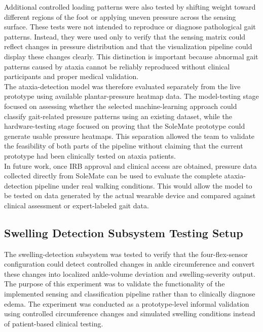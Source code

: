 \noindent Additional controlled loading patterns were also tested by shifting weight toward different regions of the foot or applying uneven pressure across the sensing surface. These tests were not intended to reproduce or diagnose pathological gait patterns. Instead, they were used only to verify that the sensing matrix could reflect changes in pressure distribution and that the visualization pipeline could display these changes clearly. This distinction is important because abnormal gait patterns caused by ataxia cannot be reliably reproduced without clinical participants and proper medical validation. \\

\noindent The ataxia-detection model was therefore evaluated separately from the live prototype using available plantar-pressure heatmap data. The model-testing stage focused on assessing whether the selected machine-learning approach could classify gait-related pressure patterns using an existing dataset, while the hardware-testing stage focused on proving that the SoleMate prototype could generate usable pressure heatmaps. This separation allowed the team to validate the feasibility of both parts of the pipeline without claiming that the current prototype had been clinically tested on ataxia patients. \\

\noindent In future work, once IRB approval and clinical access are obtained, pressure data collected directly from SoleMate can be used to evaluate the complete ataxia-detection pipeline under real walking conditions. This would allow the model to be tested on data generated by the actual wearable device and compared against clinical assessment or expert-labeled gait data.







\subsection{Swelling Detection Subsystem Testing Setup}
\label{subsec:swelling_detection_testing_setup}


\noindent The swelling-detection subsystem was tested to verify that the four-flex-sensor configuration could detect controlled changes in ankle circumference and convert these changes into localized ankle-volume deviation and swelling-severity output. The purpose of this experiment was to validate the functionality of the implemented sensing and classification pipeline rather than to clinically diagnose edema. The experiment was conducted as a prototype-level informal validation using controlled circumference changes and simulated swelling conditions instead of patient-based clinical testing. \\

